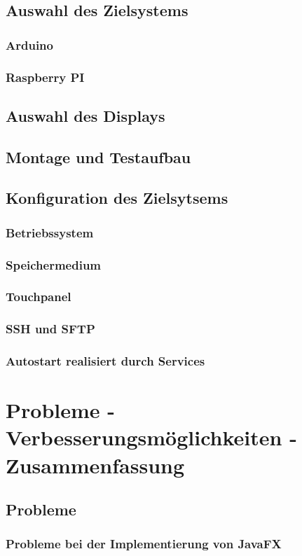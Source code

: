 \subsection{Auswahl des Zielsystems}
\subsubsection{Arduino}
\subsubsection{Raspberry PI}
\subsection{Auswahl des Displays}
\subsection{Montage und Testaufbau}
\subsection{Konfiguration des Zielsytsems}
\subsubsection{Betriebssystem}
\subsubsection{Speichermedium}
\subsubsection{Touchpanel}
\subsubsection{SSH und SFTP}
\subsubsection{Autostart realisiert durch Services}

\section{Probleme - Verbesserungsmöglichkeiten - Zusammenfassung}
\subsection{Probleme}
\subsubsection{Probleme bei der Implementierung von JavaFX}
